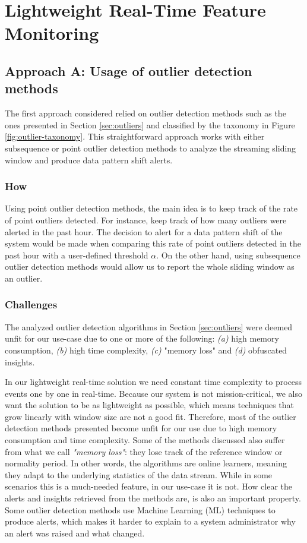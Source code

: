 \chapter{Lightweight Real-Time Feature Monitoring} \label{chap:my-work} \minitoc

\section{Approach A: Usage of outlier detection methods}
The first approach considered relied on outlier detection methods such as the ones presented in Section \ref{sec:outliers} and classified by the taxonomy in Figure \ref{fig:outlier-taxonomy}. This straightforward approach works with either subsequence or point outlier detection methods to analyze the streaming sliding window and produce data pattern shift alerts.

\subsection*{How}

Using point outlier detection methods, the main idea is to keep track of the rate of point outliers detected. For instance, keep track of how many outliers were alerted in the past hour. The decision to alert for a data pattern shift of the system would be made when comparing this rate of point outliers detected in the past hour with a user-defined threshold $\alpha$. On the other hand, using subsequence outlier detection methods would allow us to report the whole sliding window as an outlier. 


\subsection*{Challenges}
The analyzed outlier detection algorithms in Section \ref{sec:outliers} were deemed unfit for our use-case due to one or more of the following: \textit{(a)} high memory consumption, \textit{(b)} high time complexity, \textit{(c)} "memory loss" and \textit{(d)} obfuscated insights.

In our lightweight real-time solution we need constant time complexity to process events one by one in real-time. Because our system is not mission-critical, we also want the solution to be as lightweight as possible, which means techniques that grow linearly with window size are not a good fit. Therefore, most of the outlier detection methods presented become unfit for our use due to high memory consumption and time complexity. Some of the methods discussed also suffer from what we call \textit{"memory loss"}: they lose track of the reference window or normality period. In other words, the algorithms are online learners, meaning they adapt to the underlying statistics of the data stream. While in some scenarios this is a much-needed feature, in our use-case it is not. How clear the alerts and insights retrieved from the methods are, is also an important property. Some outlier detection methods use Machine Learning (ML) techniques to produce alerts, which makes it harder to explain to a system administrator why an alert was raised and what changed.

